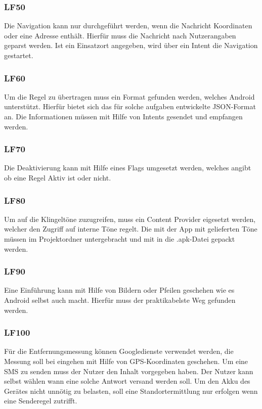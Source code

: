 \subsubsection{LF50}
Die Navigation kann nur durchgef\"uhrt werden, wenn die Nachricht Koordinaten oder eine Adresse enth\"alt. Hierf\"ur muss die Nachricht nach Nutzerangaben geparst werden. Ist ein Einsatzort angegeben, wird \"uber ein Intent die Navigation gestartet.

\subsubsection{LF60}
Um die Regel zu \"ubertragen muss ein Format gefunden werden, welches Android unterst\"utzt. Hierf\"ur bietet sich das f\"ur solche aufgaben entwickelte JSON-Format an. Die Informationen m\"ussen mit Hilfe von Intents gesendet und empfangen werden.

\subsubsection{LF70}
Die Deaktivierung kann mit Hilfe eines Flags umgesetzt werden, welches angibt ob eine Regel Aktiv ist oder nicht.

\subsubsection{LF80}
Um auf die Klingelt\"one zuzugreifen, muss ein Content Provider eigesetzt werden, welcher den Zugriff auf interne T\"one regelt. Die mit der App mit gelieferten T\"one m\"ussen im Projektordner untergebracht und mit in die .apk-Datei gepackt werden.

\subsubsection{LF90}
Eine Einf\"uhrung kann mit Hilfe von Bildern oder Pfeilen geschehen wie es Android selbst auch macht. Hierf\"ur muss der praktikabelste Weg gefunden werden.

\subsubsection{LF100}
F\"ur die Entfernungsmessung k\"onnen Googledienste verwendet werden, die Messung soll bei eingehen mit Hilfe von GPS-Koordinaten geschehen. Um eine SMS zu senden muss der Nutzer den Inhalt vorgegeben haben. Der Nutzer kann selbst w\"ahlen wann eine solche Antwort versand werden soll. Um den Akku des Ger\"ates nicht unn\"otig zu belasten, soll eine Standortermittlung nur erfolgen wenn eine Senderegel zutrifft.

